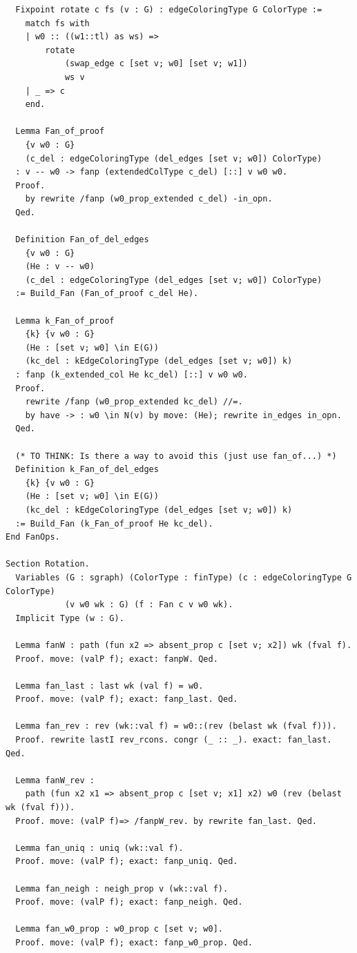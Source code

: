 \begin{verbatim}
  Fixpoint rotate c fs (v : G) : edgeColoringType G ColorType :=
    match fs with
    | w0 :: ((w1::tl) as ws) =>
        rotate
            (swap_edge c [set v; w0] [set v; w1])
            ws v
    | _ => c
    end. 

  Lemma Fan_of_proof 
    {v w0 : G} 
    (c_del : edgeColoringType (del_edges [set v; w0]) ColorType) 
  : v -- w0 -> fanp (extendedColType c_del) [::] v w0 w0.
  Proof.
    by rewrite /fanp (w0_prop_extended c_del) -in_opn.
  Qed.

  Definition Fan_of_del_edges 
    {v w0 : G}
    (He : v -- w0)
    (c_del : edgeColoringType (del_edges [set v; w0]) ColorType)
  := Build_Fan (Fan_of_proof c_del He).

  Lemma k_Fan_of_proof
    {k} {v w0 : G} 
    (He : [set v; w0] \in E(G))
    (kc_del : kEdgeColoringType (del_edges [set v; w0]) k) 
  : fanp (k_extended_col He kc_del) [::] v w0 w0.
  Proof.
    rewrite /fanp (w0_prop_extended kc_del) //=.
    by have -> : w0 \in N(v) by move: (He); rewrite in_edges in_opn.
  Qed.

  (* TO THINK: Is there a way to avoid this (just use fan_of...) *)
  Definition k_Fan_of_del_edges 
    {k} {v w0 : G}
    (He : [set v; w0] \in E(G))
    (kc_del : kEdgeColoringType (del_edges [set v; w0]) k) 
  := Build_Fan (k_Fan_of_proof He kc_del).
End FanOps.

Section Rotation. 
  Variables (G : sgraph) (ColorType : finType) (c : edgeColoringType G ColorType)
            (v w0 wk : G) (f : Fan c v w0 wk).
  Implicit Type (w : G).

  Lemma fanW : path (fun x2 => absent_prop c [set v; x2]) wk (fval f).
  Proof. move: (valP f); exact: fanpW. Qed.

  Lemma fan_last : last wk (val f) = w0.
  Proof. move: (valP f); exact: fanp_last. Qed.

  Lemma fan_rev : rev (wk::val f) = w0::(rev (belast wk (fval f))).
  Proof. rewrite lastI rev_rcons. congr (_ :: _). exact: fan_last. Qed.

  Lemma fanW_rev : 
    path (fun x2 x1 => absent_prop c [set v; x1] x2) w0 (rev (belast wk (fval f))).
  Proof. move: (valP f)=> /fanpW_rev. by rewrite fan_last. Qed.

  Lemma fan_uniq : uniq (wk::val f).
  Proof. move: (valP f); exact: fanp_uniq. Qed.

  Lemma fan_neigh : neigh_prop v (wk::val f).
  Proof. move: (valP f); exact: fanp_neigh. Qed.

  Lemma fan_w0_prop : w0_prop c [set v; w0].
  Proof. move: (valP f); exact: fanp_w0_prop. Qed.


\end{verbatim}

